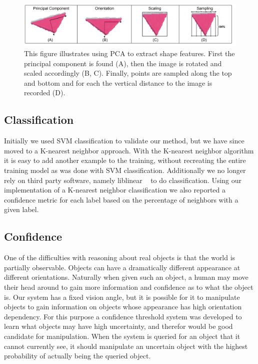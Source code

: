 \documentclass[11pt]{article}
\begin{document}
\begin{figure}[h!]
\centering
    \includegraphics[width=1.0\textwidth]{figures/PCA_example.png}
\caption{This figure illustrates using PCA to extract shape features. First the principal component is found (A), then the image is rotated and scaled accordingly (B, C). Finally, points are sampled along the top and bottom and for each the vertical distance to the image is recorded (D).}
    \label{fig:pca}
\end{figure}

\subsection{Classification}
Initially we used SVM classification to validate our method, but we have since
moved to a K-nearest neighbor approach.  With the K-nearest neighbor algorithm
it is easy to add another example to the training, without recreating the
entire training model as was done with SVM classification.  Additionally we no
longer rely on third party software, namely liblinear ~\cite{LIBLINEAR} to do
classification. Using our implementation of a K-nearest neighbor
classification we also reported a confidence metric for each label based on the
percentage of neighbors with a given label.

\subsection{Confidence}
One of the difficulties with reasoning about real objects is that the world is
partially observable. Objects can have a dramatically different appearance at
different orientations. Naturally when given such an object, a human may move
their head around to gain more information and confidence as to what the object is.
Our system has a fixed vision angle, but it is possible for it to
manipulate objects to gain information on objects whose appearance has high
orientation dependency. For this purpose a confidence threshold system was
developed to learn what objects may have high uncertainty, and therefor would
be good candidate for manipulation. When the system is queried for an object
that it cannot currently see, it should manipulate an uncertain object with the
highest probability of actually being the queried object.
\end{document}
